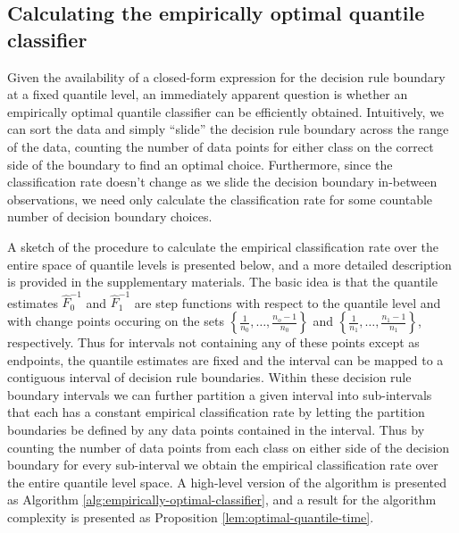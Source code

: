 \subsection{Calculating the empirically optimal quantile classifier}
\label{sec:empirically-optimal-algo}

Given the availability of a closed-form expression for the decision rule
boundary at a fixed quantile level, an immediately apparent question is whether
an empirically optimal quantile classifier can be efficiently obtained.
Intuitively, we can sort the data and simply ``slide'' the decision rule
boundary across the range of the data, counting the number of data points for
either class on the correct side of the boundary to find an optimal choice.
Furthermore, since the classification rate doesn't change as we slide the
decision boundary in-between observations, we need only calculate the
classification rate for some countable number of decision boundary choices.

A sketch of the procedure to calculate the empirical classification rate over
the entire space of quantile levels is presented below, and a more detailed
description is provided in the supplementary materials.  The basic idea is that
the quantile estimates $\hat{F}_0^{-1}$ and $\hat{F}_1^{-1}$ are step functions
with respect to the quantile level and with change points occuring on the sets
$\left\{\frac{1}{n_0}, \dots, \frac{n_o - 1}{n_0}\right\}$ and
$\left\{\frac{1}{n_1}, \dots, \frac{n_1 - 1}{n_1}\right\}$, respectively.  Thus
for intervals not containing any of these points except as endpoints, the
quantile estimates are fixed and the interval can be mapped to a contiguous
interval of decision rule boundaries.  Within these decision rule boundary
intervals we can further partition a given interval into sub-intervals that each
has a constant empirical classification rate by letting the partition boundaries
be defined by any data points contained in the interval.  Thus by counting the
number of data points from each class on either side of the decision boundary
for every sub-interval we obtain the empirical classification rate over the
entire quantile level space.  A high-level version of the algorithm is presented
as Algorithm \ref{alg:empirically-optimal-classifier}, and a result for the
algorithm complexity is presented as Proposition
\ref{lem:optimal-quantile-time}.

